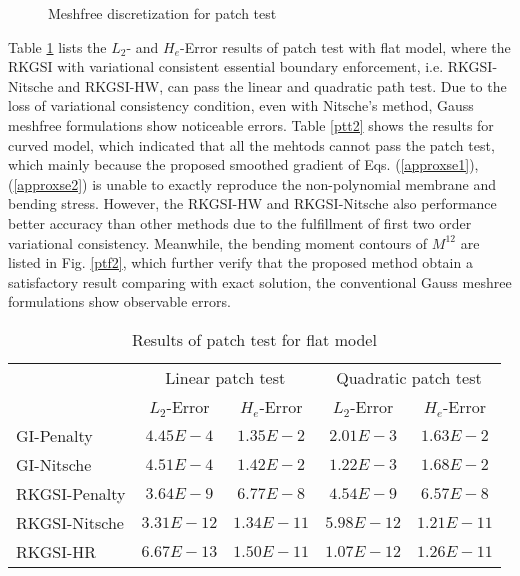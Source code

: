 \begin{figure}[!ht]
    \centering
    \caption{Meshfree discretization for patch test}\label{ptf1}
\end{figure}

Table \ref{ptt1} lists the $L_2$- and $H_e$-Error results of patch test with flat model, where the RKGSI with variational consistent essential boundary enforcement, i.e. RKGSI-Nitsche and RKGSI-HW, can pass the linear and quadratic path test. Due to the loss of variational consistency condition, even with Nitsche's method, Gauss meshfree formulations show noticeable errors. Table \ref{ptt2} shows the results for curved model, which indicated that all the mehtods cannot pass the patch test, which mainly because the proposed smoothed gradient of Eqs. (\ref{approxse1}), (\ref{approxse2}) is unable to exactly reproduce the non-polynomial membrane and bending stress. However, the RKGSI-HW and RKGSI-Nitsche also performance better accuracy than other methods due to the fulfillment of first two order variational consistency. Meanwhile, the bending moment contours of $M^{12}$ are listed in Fig. \ref{ptf2}, which further verify that the proposed method obtain a satisfactory result comparing with exact solution, the conventional Gauss meshree formulations show observable errors.

\begin{table}[!ht]
\centering
\caption{Results of patch test for flat model}\label{ptt1}
\begin{tabular}{lcccc}
\toprule
 & \multicolumn{2}{c}{Linear patch test} & \multicolumn{2}{c}{Quadratic patch test} \\ \cline{2-5}
 & $L_2$-Error & $H_e$-Error & $L_2$-Error & $H_e$-Error \\
    \midrule
    GI-Penalty & $4.45E-4$ & $1.35E-2$ & $2.01E-3$ & $1.63E-2$ \\
    GI-Nitsche & $4.51E-4$ & $1.42E-2$ & $1.22E-3$ & $1.68E-2$ \\
    RKGSI-Penalty & $3.64E-9$ & $6.77E-8$ & $4.54E-9$ & $6.57E-8$ \\
    RKGSI-Nitsche & $3.31E-12$ & $1.34E-11$ & $5.98E-12$ & $1.21E-11$ \\
    RKGSI-HR & $6.67E-13$ & $1.50E-11$ & $1.07E-12$ & $1.26E-11$ \\
    \bottomrule
\end{tabular}
\end{table}

